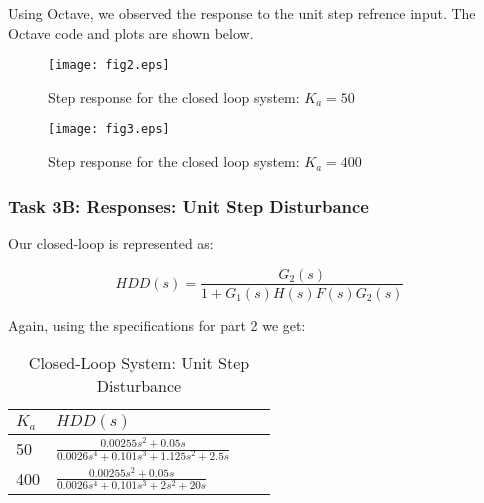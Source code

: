 \documentclass{article}
\begin{document}
Using Octave, we observed the response to the unit step refrence input. The
Octave code and plots are shown below. 



\begin{figure}[H]
  \caption{Step response for the closed loop system: $K_a = 50$}
  \centering
  \texttt{[image: fig2.eps]}
\end{figure}



\begin{figure}[H]
  \caption{Step response for the closed loop system: $K_a = 400$}
  \centering
  \texttt{[image: fig3.eps]}
\end{figure}

\subsubsection*{Task 3B: Responses: Unit Step Disturbance}


Our closed-loop is represented as: 

$$ HDD(s) = \frac{G_2(s)}{1 + G_1(s)H(s)F(s)G_2(s)} $$ 

Again, using the specifications for part 2 we get:

\begin{table}[H]
\begin{center}
  \begin{tabular}{ | l | l | l | p{5cm} |}
  \hline
  $K_a$ & $HDD(s)$  \\ \hline
  50 & $\frac{0.00255s^2 + 0.05s}{0.0026s^4 + 0.101s^3 + 1.125s^2 + 2.5s}$\\ \hline 
  400 & $\frac{0.00255s^2 + 0.05s}{0.0026s^4 + 0.101s^3 + 2s^2 + 20s}$\\ \hline 
 \end{tabular}
\end{center}
\caption{Closed-Loop System: Unit Step Disturbance}
\label{table:3}
\end{table}
\end{document}
